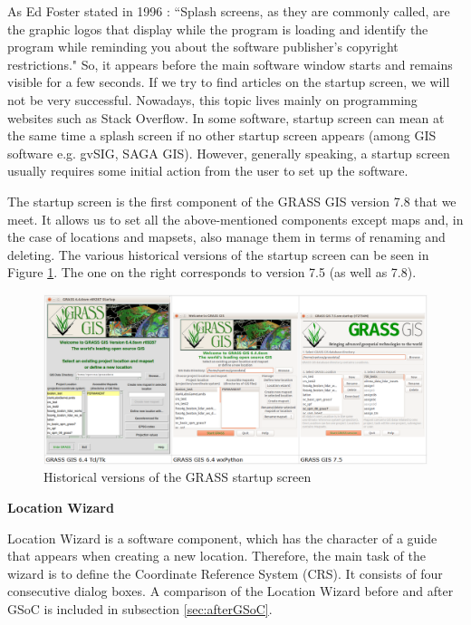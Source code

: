 \documentclass[a4paper,10pt,twoside]{article}
\begin{document}
\noindent As Ed Foster stated in 1996 \cite{foster}: ``Splash screens, as they are commonly called, are the graphic logos that display while the program is loading and identify the program while reminding you about the software publisher's copyright restrictions." So, it appears before the main software window starts and remains visible for a few seconds. If we try to find articles on the startup screen, we will not be very successful. Nowadays, this topic lives mainly on programming websites such as Stack Overflow. In some software, startup screen can mean at the same time a splash screen if no other startup screen appears (among GIS software e.g. gvSIG, SAGA GIS). However, generally speaking, a startup screen usually requires some initial action from the user to set up the software.

The startup screen is the first component of the GRASS GIS version 7.8 that we meet. It allows us to set all the above-mentioned components except maps and, in the case of locations and mapsets, also manage them in terms of renaming and deleting. The various historical versions of the startup screen can be seen in Figure \ref{fig:verze_startup}. The one on the right corresponds to version 7.5 (as well as 7.8).

\vspace{0.3cm}
\begin{figure}[hbt!]
\begin{center}
\includegraphics[width=17cm]{../pictures/verze_startup.png} 
\caption[Historical versions of the GRASS startup screen]{Historical versions of the GRASS startup screen}
\label{fig:verze_startup}
\end{center}
\end{figure}

\bigskip
\noindent \textbf {Location Wizard}

\noindent Location Wizard is a software component, which has the character of a guide that appears when creating a new location. Therefore, the main task of the wizard is to define the Coordinate Reference System (CRS). It consists of four consecutive dialog boxes. A comparison of the Location Wizard before and after GSoC is included in subsection \ref{sec:afterGSoC}.
\end{document}
